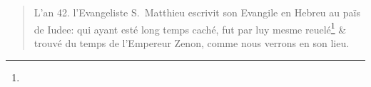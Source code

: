 
\begin{quotation}
L'an 42. l'Evangeliste S.~Matthieu escrivit son Evangile en Hebreu au païs de Iudee: qui ayant esté long temps caché, fut par luy mesme reuelé\footnote{} \& trouvé du temps de l'Empereur Zenon, comme nous verrons en son lieu.
\end{quotation}
